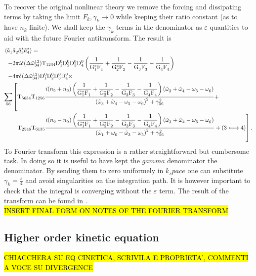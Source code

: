To recover the original nonlinear theory we remove the forcing and dissipating terms by taking the limit $F_k, \gamma_k \rightarrow 0$ while keeping their ratio constant
(as to have $n_k$ finite). We shall keep the $\gamma_k$ terms in the denominator as $\varepsilon$ quantities to aid with the future Fourier antitransform. The result is 
\begin{equation}
    \begin{aligned}
    \langle\tilde{a}_1^{} &\tilde{a}_2^{}\tilde{a}_3^{*}\tilde{a}_4^{*} \rangle = 
    \\
    -&2\pi i \delta(\Delta{\tilde{\omega}}^{12}_{34})\mathrm{T}_{1234}\mathrm{D}^0_1\mathrm{D}^0_2\mathrm{D}^0_3\mathrm{D}^0_4\left(
    \dfrac{1}{\mathrm{G}_1^*\mathrm{F}_1^{}}+\dfrac{1}{\mathrm{G}_2^*\mathrm{F}_2^{}}-\dfrac{1}{\mathrm{G}_3^{}\mathrm{F}_3^{}}-\dfrac{1}{\mathrm{G}_4^{}\mathrm{F}_4^{}}\right) 
    \\
    -&4\pi \delta(\Delta{\tilde{\omega}}^{12}_{34})\mathrm{D}^0_1\mathrm{D}^0_2\mathrm{D}^0_3\mathrm{D}^0_4 \times
    \\
      \sum_{56}&\left[\mathrm{T}_{5634}\mathrm{T}_{1256}
    \frac{i(n_5 + n_6)\left(\dfrac{1}{\mathrm{G}_1^*\mathrm{F}_1^{}}+\dfrac{1}{\mathrm{G}_2^*\mathrm{F}_2^{}}-\dfrac{1}{\mathrm{G}_3^{}\mathrm{F}_3^{}}
    -\dfrac{1}{\mathrm{G}_4^{}\mathrm{F}_4^{}}\right)\left( \tilde{\omega}^{}_3 + \tilde{\omega}^{}_4 - \omega^{}_5 - \omega^{}_6\right)}{\left( \tilde{\omega}^{}_3 + \tilde{\omega}^{}_4 - \omega^{}_5 - \omega^{}_6\right)^2 + \gamma^2_{56}}
    +  \right.
    \\
    &\hspace{2mm}\left. \mathrm{T}_{2546}\mathrm{T}_{6135}
    \frac{i(n_6 - n_5)\left(\dfrac{1}{\mathrm{G}_1^*\mathrm{F}_1^{}}+\dfrac{1}{\mathrm{G}_2^*\mathrm{F}_2^{}}-\dfrac{1}{\mathrm{G}_3^{}\mathrm{F}_3^{}}
    -\dfrac{1}{\mathrm{G}_4^{}\mathrm{F}_4^{}}\right)\left( \tilde{\omega}^{}_3 + \tilde{\omega}^{}_4 - \omega^{}_5 - \omega^{}_6\right)}{\left( \tilde{\omega}^{}_1 + \omega^{}_6 - \tilde{\omega}^{}_3 - \omega^{}_5\right)^2 + \gamma^2_{56}}
    + \left( 3 \longleftrightarrow 4 \right) \right].
    \end{aligned}
\end{equation}
To Fourier transform this expression is a rather straightforward but cumbersome task. In doing so it is useful to have kept the $gamma$ denominator the denominator. 
By sending them to zero uniformely in $k_space$ one can substitute $\gamma_k= \frac{\varepsilon}{4}$ and avoid singularities on the integration path. It is however important 
to check that the integral is converging without the $\varepsilon$ term. The result of the transform can be found in \cite{Rosenhaus2023}.\\
\hl{INSERT FINAL FORM ON NOTES OF THE FOURIER TRANSFORM}
\subsection{Higher order kinetic equation}

\hl{CHIACCHERA SU EQ CINETICA, SCRIVILA E PROPRIETA', COMMENTI A VOCE SU DIVERGENCE}



